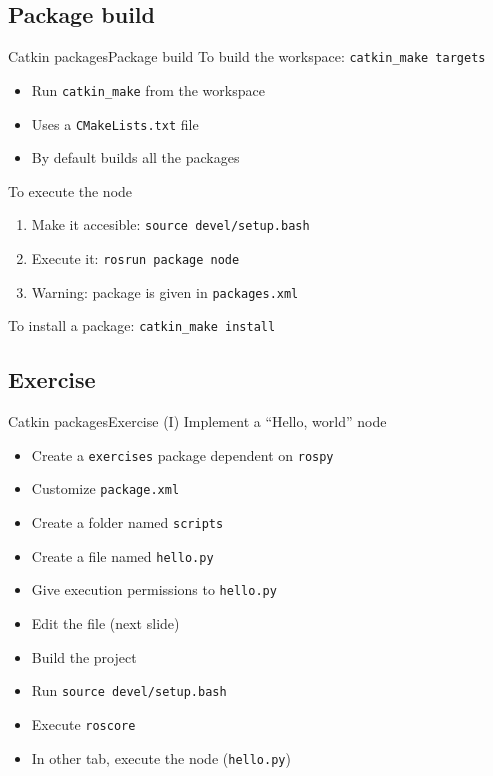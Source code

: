 \documentclass[10pt,compress]{beamer} %
\begin{document}
\subsection{Package build}
\begin{frame}[fragile]{Catkin packages}{Package build}
	To build the workspace: \texttt{catkin\_make targets}
	\begin{itemize}
		\item Run \texttt{catkin\_make} from the workspace
		\item Uses a \texttt{CMakeLists.txt} file
		\item By default builds all the packages
	\end{itemize}
	To execute the node
	\begin{enumerate}
		\item Make it accesible: \texttt{source devel/setup.bash}
		\item Execute it: \texttt{rosrun package node}
		\item[] Warning: package is given in \texttt{packages.xml}
	\end{enumerate}
	To install a package: \texttt{catkin\_make install}
\end{frame}

\subsection{Exercise}
\begin{frame}[fragile]{Catkin packages}{Exercise (I)}
	Implement a ``Hello, world'' node
	\begin{itemize}
		\item Create a \texttt{exercises} package dependent on \texttt{rospy}
		\item Customize \texttt{package.xml}
		\item Create a folder named \texttt{scripts}
		\item Create a file named \texttt{hello.py}
		\item Give execution permissions to \texttt{hello.py}
		\item Edit the file (next slide)
		\item Build the project
		\item Run \texttt{source devel/setup.bash}
		\item Execute \texttt{roscore}
		\item In other tab, execute the node (\texttt{hello.py})
	\end{itemize}
\end{frame}
\end{document}
